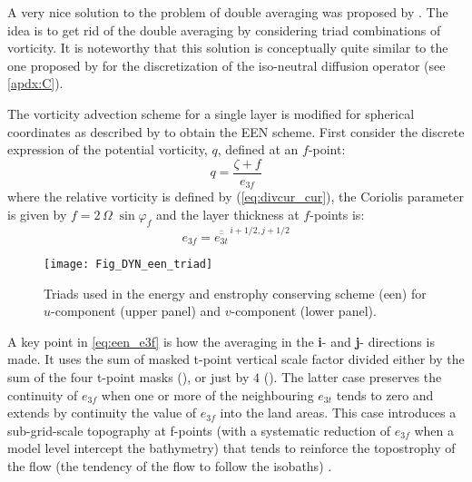 \documentclass[../main/NEMO_manual]{subfiles}
\begin{document}
A very nice solution to the problem of double averaging was proposed by \citet{Arakawa_Hsu_MWR90}.
The idea is to get rid of the double averaging by considering triad combinations of vorticity.
It is noteworthy that this solution is conceptually quite similar to the one proposed by
\citep{Griffies_al_JPO98} for the discretization of the iso-neutral diffusion operator (see \autoref{apdx:C}).

The \citet{Arakawa_Hsu_MWR90} vorticity advection scheme for a single layer is modified 
for spherical coordinates as described by \citet{Arakawa_Lamb_MWR81} to obtain the EEN scheme. 
First consider the discrete expression of the potential vorticity, $q$, defined at an $f$-point: 
\[
  q  = \frac{\zeta +f} {e_{3f} }
\]
where the relative vorticity is defined by (\autoref{eq:divcur_cur}),
the Coriolis parameter is given by $f=2 \,\Omega \;\sin \varphi _f $ and the layer thickness at $f$-points is: 
\begin{equation}
  \label{eq:een_e3f}
  e_{3f} = \overline{\overline {e_{3t} }} ^{\,i+1/2,j+1/2}
\end{equation}

\begin{figure}[!ht]
  \begin{center}
    \texttt{[image: Fig\_DYN\_een\_triad]}
    \caption{
      \protect\label{fig:DYN_een_triad}
      Triads used in the energy and enstrophy conserving scheme (een) for
      $u$-component (upper panel) and $v$-component (lower panel).
    }
  \end{center}
\end{figure}

A key point in \autoref{eq:een_e3f} is how the averaging in the \textbf{i}- and \textbf{j}- directions is made. 
It uses the sum of masked t-point vertical scale factor divided either by the sum of the four t-point masks
(), or just by $4$ ().
The latter case preserves the continuity of $e_{3f}$ when one or more of the neighbouring $e_{3t}$ tends to zero and
extends by continuity the value of $e_{3f}$ into the land areas.
This case introduces a sub-grid-scale topography at f-points
(with a systematic reduction of $e_{3f}$ when a model level intercept the bathymetry)
that tends to reinforce the topostrophy of the flow
(\ie the tendency of the flow to follow the isobaths) \citep{Penduff_al_OS07}. 
\end{document}
